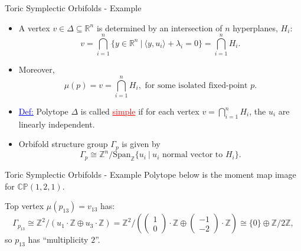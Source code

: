 \documentclass[aspectratio=169,xcolor=dvipsnames]{beamer}
\newcommand{\ZZ}{\mathbb{Z}}
\newcommand{\RR}{\mathbb{R}}
\newcommand{\CC}{\mathbb{C}}
\newcommand{\PP}{\mathbb{P}}
\newcommand{\Span}{\text{Span}}
\begin{document}
\begin{frame}{Toric Symplectic Orbifolds - Example}
    \begin{itemize}
        \item A vertex $v \in \Delta \subseteq \RR^{n}$ is determined by an intersection of $n$ hyperplanes, $H_{i}$:
        \[
        v = \bigcap_{i=1}^{n} \{ y \in \RR^{n}~|~\langle y, u_{i}\rangle + \lambda_{i} = 0 \} = \bigcap_{i=1}^{n} H_{i}.
        \]
        \item Moreover,
        \[
        \mu(p) = v = \bigcap_{i=1}^{n}H_{i}, \text{ for some isolated fixed-point } p.
        \]
        \item \textcolor{blue}{\underline{Def:}} Polytope $\Delta$ is called \textcolor{red}{\underline{simple}} if for each vertex $v = \bigcap_{i=1}^{n}H_{i}$, the $u_{i}$ are linearly independent.
        \item Orbifold structure group $\Gamma_{p}$ is given by
        \[
        \Gamma_{p} \cong \ZZ^{n} / \Span_{\ZZ}\{u_{i}~|~u_{i} \text{ normal vector to } H_{i} \}.
        \]
    \end{itemize}	
\end{frame}

\begin{frame}{Toric Symplectic Orbifolds - Example}
	Polytope below is the moment map image for $\CC\PP(1,2,1)$.
	\begin{figure}[h!]
		\centering
	\end{figure}
	Top vertex $\mu(p_{13}) = v_{13}$ has:
	\[
		\Gamma_{p_{13}} \cong \ZZ^{2} / \left(u_{1}\cdot \ZZ \oplus u_{3}\cdot \ZZ \right) = \ZZ^{2} / \left(\begin{pmatrix} 1 \\ 0 \end{pmatrix} \cdot \ZZ \oplus \begin{pmatrix} -1 \\ -2 \end{pmatrix}\cdot \ZZ \right) \cong \{0\} \oplus \ZZ/2\ZZ,
	\]
	so $p_{13}$ has ``multiplicity $2$''.
\end{frame}
\end{document}
